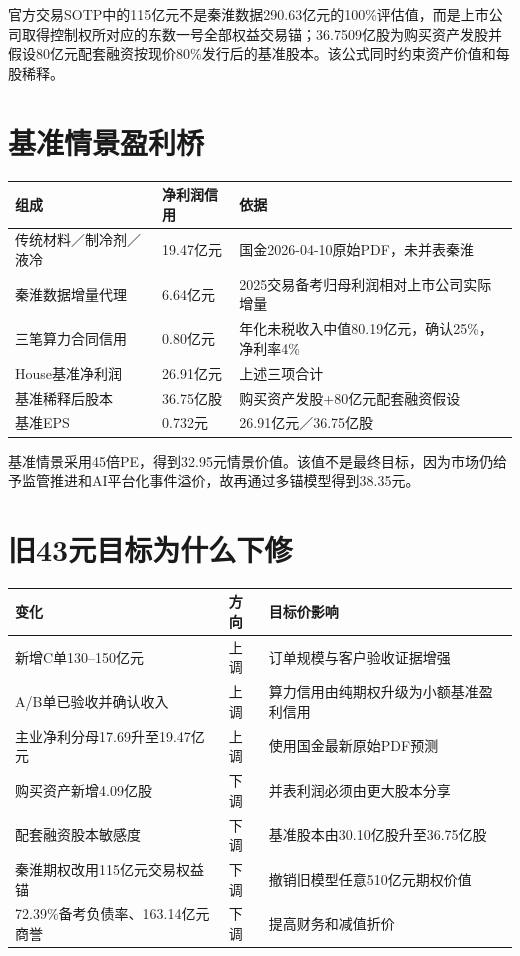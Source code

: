 官方交易SOTP中的115亿元不是秦淮数据290.63亿元的100\%评估值，而是上市公司取得控制权所对应的东数一号全部权益交易锚；36.7509亿股为购买资产发股并假设80亿元配套融资按现价80\%发行后的基准股本。该公式同时约束资产价值和每股稀释。

\section{基准情景盈利桥}

\begin{exhibitbox}[2026E基准净利润与EPS]
\noindent\begin{tabularx}{\textwidth}{L{3.8cm}R{2.0cm}X}
\toprule
\textbf{组成} & \textbf{净利润信用} & \textbf{依据} \\
\midrule
传统材料／制冷剂／液冷 & 19.47亿元 & 国金2026-04-10原始PDF，未并表秦淮 \\
秦淮数据增量代理 & 6.64亿元 & 2025交易备考归母利润相对上市公司实际增量 \\
三笔算力合同信用 & 0.80亿元 & 年化未税收入中值80.19亿元，确认25\%，净利率4\% \\
House基准净利润 & 26.91亿元 & 上述三项合计 \\
基准稀释后股本 & 36.75亿股 & 购买资产发股+80亿元配套融资假设 \\
基准EPS & 0.732元 & 26.91亿元／36.75亿股 \\
\bottomrule
\end{tabularx}
\end{exhibitbox}

基准情景采用45倍PE，得到32.95元情景价值。该值不是最终目标，因为市场仍给予监管推进和AI平台化事件溢价，故再通过多锚模型得到38.35元。

\section{旧43元目标为什么下修}

\begin{exhibitbox}[目标价调整归因]
\noindent\begin{tabularx}{\textwidth}{L{3.2cm}L{2.2cm}X}
\toprule
\textbf{变化} & \textbf{方向} & \textbf{目标价影响} \\
\midrule
新增C单130--150亿元 & 上调 & 订单规模与客户验收证据增强 \\
A/B单已验收并确认收入 & 上调 & 算力信用由纯期权升级为小额基准盈利信用 \\
主业净利分母17.69升至19.47亿元 & 上调 & 使用国金最新原始PDF预测 \\
购买资产新增4.09亿股 & 下调 & 并表利润必须由更大股本分享 \\
配套融资股本敏感度 & 下调 & 基准股本由30.10亿股升至36.75亿股 \\
秦淮期权改用115亿元交易权益锚 & 下调 & 撤销旧模型任意510亿元期权价值 \\
72.39\%备考负债率、163.14亿元商誉 & 下调 & 提高财务和减值折价 \\
\bottomrule
\end{tabularx}
\end{exhibitbox}

